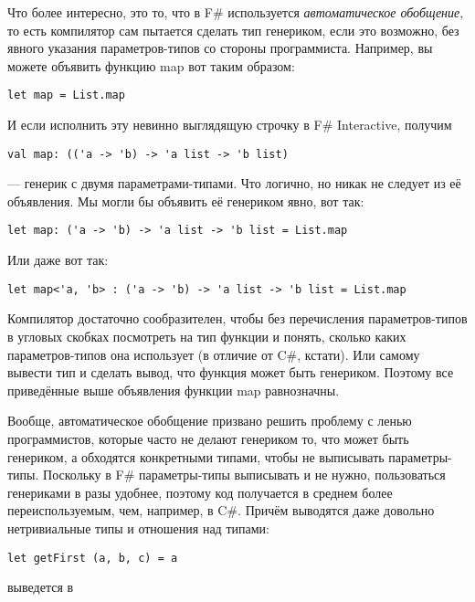 \documentclass{../../text-style}
\begin{document}
Что более интересно, это то, что в F\# используется \emph{автоматическое обобщение}, то есть компилятор сам пытается сделать тип генериком, если это возможно, без явного указания параметров-типов со стороны программиста. Например, вы можете объявить функцию map вот таким образом:

\begin{verbatim}
let map = List.map
\end{verbatim}

И если исполнить эту невинно выглядящую строчку в F\# Interactive, получим

\begin{verbatim}
val map: (('a -> 'b) -> 'a list -> 'b list)
\end{verbatim}

--- генерик с двумя параметрами-типами. Что логично, но никак не следует из её объявления. Мы могли бы объявить её генериком явно, вот так: 

\begin{verbatim}
let map: ('a -> 'b) -> 'a list -> 'b list = List.map
\end{verbatim}

Или даже вот так:

\begin{verbatim}
let map<'a, 'b> : ('a -> 'b) -> 'a list -> 'b list = List.map
\end{verbatim}

Компилятор достаточно сообразителен, чтобы без перечисления параметров-типов в угловых скобках посмотреть на тип функции и понять, сколько каких параметров-типов она использует (в отличие от C\#, кстати). Или самому вывести тип и сделать вывод, что функция может быть генериком. Поэтому все приведённые выше объявления функции map равнозначны.

Вообще, автоматическое обобщение призвано решить проблему с ленью программистов, которые часто не делают генериком то, что может быть генериком, а обходятся конкретными типами, чтобы не выписывать параметры-типы. Поскольку в F\# параметры-типы выписывать и не нужно, пользоваться генериками в разы удобнее, поэтому код получается в среднем более переиспользуемым, чем, например, в C\#. Причём выводятся даже довольно нетривиальные типы и отношения над типами:

\begin{verbatim}
let getFirst (a, b, c) = a
\end{verbatim}

выведется в 
\end{document}
